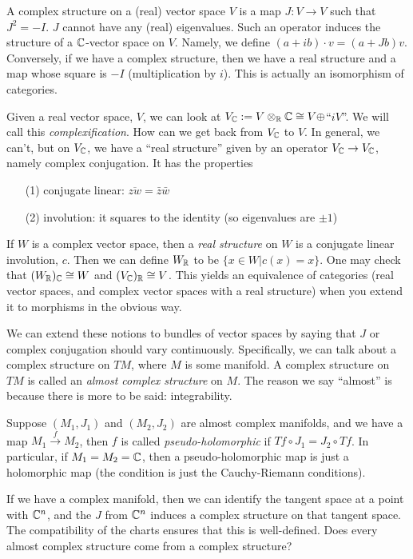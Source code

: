  \setcounter{lecture}{7}

 A complex structure on a (real) vector space $V$ is a map $J:V\to
 V$ such that $J^2=-I$.  $J$ cannot have any (real) eigenvalues.
 Such an operator induces the structure of a $\mathbb{C}$-vector space on
 $V$.  Namely, we define $(a+ib)\cdot v = (a+Jb)v$.  Conversely,
 if we have a complex structure, then we have a real structure and
 a map whose square is $-I$ (multiplication by $i$).  This is
 actually an isomorphism of categories.

 Given a real vector space, $V$, we can look at
 $V_{\mathbb{C}}:=V\otimes_{\mathbb{R}} \mathbb{C}\cong V\oplus $``$iV$''.  We will call
 this \emph{complexification}.  How can we get back from $V_{\mathbb{C}}$
 to $V$.  In general, we can't, but on $V_{\mathbb{C}}$, we have a ``real
 structure'' given by an operator $V_{\mathbb{C}}\to V_{\mathbb{C}}$, namely complex
 conjugation.  It has the properties
 \begin{itemize}
 \item[(1)] conjugate linear: $\overline{zw} = \bar z\bar w$
 \item[(2)] involution: it squares to the identity (so eigenvalues are $\pm
 1$)
 \end{itemize}
 If $W$ is a complex vector space, then a \emph{real structure} on
 $W$ is a conjugate linear involution, $c$.  Then we can define
 $W_{\mathbb{R}}$ to be $\{x\in W|c(x)=x\}$.  One may check that
 $(W_{\mathbb{R}})_{\mathbb{C}}\cong W$ and $(V_{\mathbb{C}})_{\mathbb{R}}\cong V$.  This yields an
 equivalence of categories (real vector spaces, and complex vector
 spaces with a real structure) when you extend it to morphisms in
 the obvious way.

 We can extend these notions to bundles of vector spaces by saying
 that $J$ or complex conjugation should vary continuously.
 Specifically, we can talk about a complex structure on $TM$,
 where $M$ is some manifold.  A complex structure on $TM$ is
 called an \emph{almost complex structure} on $M$.  The reason we
 say ``almost'' is because there is more to be said:
 integrability.

 Suppose $(M_1,J_1)$ and $(M_2,J_2)$ are almost complex manifolds,
 and we have a map $M_1\xrightarrow{f}  M_2$, then $f$ is called
 \emph{pseudo-holomorphic} if $Tf\circ J_1 = J_2\circ Tf$.  In
 particular, if $M_1=M_2=\mathbb{C}$, then a pseudo-holomorphic map is
 just a holomorphic map (the condition is just the Cauchy-Riemann
 conditions).

 If we have a complex manifold, then we can identify the tangent
 space at a point with $\mathbb{C}^n$, and the $J$ from $\mathbb{C}^n$ induces a
 complex structure on that tangent space.  The compatibility of
 the charts ensures that this is well-defined.  Does every almost
 complex structure come from a complex structure?

